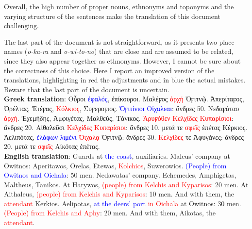 Overall, the high number of proper nouns, ethnonyms and toponyms and the varying structure of the sentences make the translation of this document challenging.

The last part of the document is not straightforward, as it presents two place names (\textit{o-ka-ra} and \textit{o-wi-to-no}) that are close and are assumed to be related, since they also appear together as ethnonyms.
However, I cannot be sure about the correctness of this choice.
Here I report an improved version of the translations, highlighting in red the adjustments and in blue the actual mistakes.
Beware that the last part of the document is uncertain. \\
\textbf{Greek translation}: \textgreek{Οὖροι} \textcolor{blue}{\textgreek{ἐφαλός}}\textgreek{, ἐπίκουροι. Μαλέϝος} \textcolor{red}{\textgreek{ἀρχή}} \textgreek{Ὀϝιτνῷ. Ἀπερίταϝος, Ὀρέλτας, Ἐτέϝας,} \textcolor{red}{\textgreek{Κόλκιος}}\textgreek{, Συϝεροϝιος.} \textcolor{blue}{\textgreek{Ὀϝιτίνιοι Οἰχαλεαι}}\textgreek{: ἄνδρες 50. Νεδαϝάταο} \textcolor{red}{\textgreek{ἀρχή}}\textgreek{. Ἐχεμήδης, Ἀμφιγέτας, Μαλθεύς, Τάνικος.} \textcolor{red}{\textgreek{Ἁρυϝόθεν Κελχίδες Κυπαρίσιοι}}\textgreek{: ἄνδρες 20. Αἰθαλεῦσι} \textcolor{red}{\textgreek{Κελχίδες Κυπαρίσιοι}}\textgreek{: ἄνδρες 10. μετά τε} \textcolor{red}{\textgreek{σφεῖς}} \textgreek{ἑπέτας Κέρκιος. Ἀελιπότας,} \textcolor{blue}{\textgreek{ἐλάφων λιμένι}} \textcolor{red}{\textgreek{Ὀιχαλᾳ}} \textgreek{Ὀϝιτνῷ: ἄνδρες 30.} \textcolor{red}{\textgreek{Κελχίδες}} \textgreek{τε Ἀφυγάνες: ἄνδρες 20. μετά τε} \textcolor{red}{\textgreek{σφεῖς}} \textgreek{Αἰκότας ἑπέτας.} \\
\textbf{English translation}: Guards at \textcolor{blue}{the coast}, auxiliaries. Maleus' company at Owitnos: Aperitawos, Orelas, Etewas, \textcolor{red}{Kolchios}, Suwerowios. \textcolor{blue}{(People) from Owitnos and Oichala}: 50 men. Nedawatas' company. Echemedes, Amphigetas, Maltheus, Tanikos. At Harywos, \textcolor{red}{(people) from Kelchis and Kyparisos}: 20 men. At Aithaleus, \textcolor{red}{(people) from Kelchis and Kyparisos}: 10 men. And with them, the \textcolor{red}{attendant} Kerkios. Aelipotas, \textcolor{blue}{at the deers' port} \textcolor{red}{in Oichala} at Owitnos: 30 men. \textcolor{red}{(People) from Kelchis and Aphy}: 20 men. And with them, Aikotas, the \textcolor{red}{attendant}.

